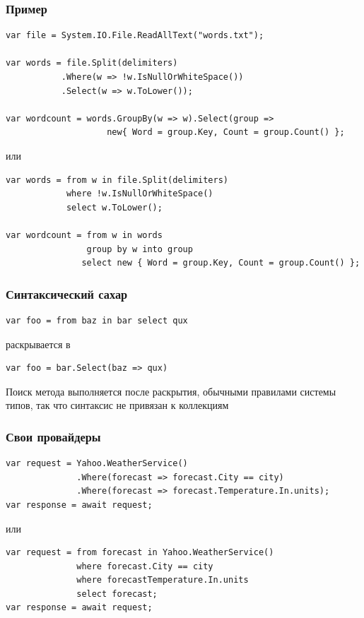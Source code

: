 \documentclass[xetex,mathserif,serif]{beamer}
\begin{document}
	\begin{frame}[fragile]
		\frametitle{Пример}
		\begin{footnotesize}
			\begin{verbatim}
var file = System.IO.File.ReadAllText("words.txt"); 

var words = file.Split(delimiters) 
           .Where(w => !w.IsNullOrWhiteSpace()) 
           .Select(w => w.ToLower());

var wordcount = words.GroupBy(w => w).Select(group =>
                    new{ Word = group.Key, Count = group.Count() };
			\end{verbatim}
		\end{footnotesize}
		\vspace{3mm}
		или
		\begin{footnotesize}
			\begin{verbatim}
var words = from w in file.Split(delimiters) 
            where !w.IsNullOrWhiteSpace() 
            select w.ToLower();

var wordcount = from w in words 
                group by w into group 
               select new { Word = group.Key, Count = group.Count() };
			\end{verbatim}
		\end{footnotesize}
	\end{frame}

	\begin{frame}[fragile]
		\frametitle{Синтаксический сахар}
		\begin{verbatim}
var foo = from baz in bar select qux
		\end{verbatim}
		\vspace{3mm}
		раскрывается в
		\begin{verbatim}
var foo = bar.Select(baz => qux)
		\end{verbatim}
		\vspace{3mm}
		Поиск метода выполняется после раскрытия, обычными правилами системы типов, так что синтаксис не привязан к коллекциям
	\end{frame}

	\begin{frame}[fragile]
		\frametitle{Свои провайдеры}
		\begin{verbatim}
var request = Yahoo.WeatherService()
              .Where(forecast => forecast.City == city)
              .Where(forecast => forecast.Temperature.In.units); 
var response = await request;
		\end{verbatim}
		\vspace{3mm}
		или
		\begin{verbatim}
var request = from forecast in Yahoo.WeatherService() 
              where forecast.City == city 
              where forecastTemperature.In.units 
              select forecast; 
var response = await request;
		\end{verbatim}
	\end{frame}
\end{document}
